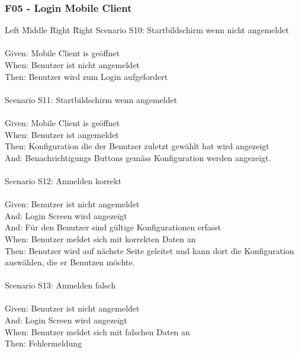 \subsubsection*{F05 - Login Mobile Client}
\begin{tabbing}
    Left \= Middle \= Right \= Right  \kill
    Scenario S10: \> \> \>  Startbildschirm wenn nicht angemeldet\\ \\
    Given: \> \> \>   Mobile Client is geöffnet\\
    When: \> \> \>  Benutzer ist nicht angemeldet\\
    Then: \> \> \>  Benutzer wird zum Login aufgefordert\\
    \\
    Scenario S11: \> \> \>  Startbildschirm wenn angemeldet\\ \\
    Given: \> \> \>   Mobile Client is geöffnet\\
    When: \> \> \>  Benutzer ist angemeldet\\
    Then: \> \> \>  Konfiguration die der Benutzer zuletzt gewählt hat wird angezeigt\\
    And: \> \> \>    Benachrichtigungs Buttons gemäss Konfiguration werden angezeigt.\\
    \\
    Scenario S12: \> \> \>  Anmelden korrekt\\ \\
    Given: \> \> \>  Benutzer ist nicht angemeldet\\
    And: \> \> \>    Login Screen wird angezeigt\\
    And: \> \> \>     Für den Benutzer sind gültige Konfigurationen erfasst\\
    When: \> \> \>   Benutzer meldet sich mit korrekten Daten an\\
    Then: \> \> \>   Benutzer wird auf nächste Seite geleitet und kann dort die Konfiguration auswählen, die er Benutzen möchte.\\
    \\
    Scenario S13: \> \> \>  Anmelden falsch\\ \\
    Given: \> \> \>  Benutzer ist nicht angemeldet\\
    And: \> \> \>    Login Screen wird angezeigt\\
    When: \> \> \>   Benutzer meldet sich mit falschen Daten an\\
    Then: \> \> \>   Fehlermeldung\\

\end{tabbing}
